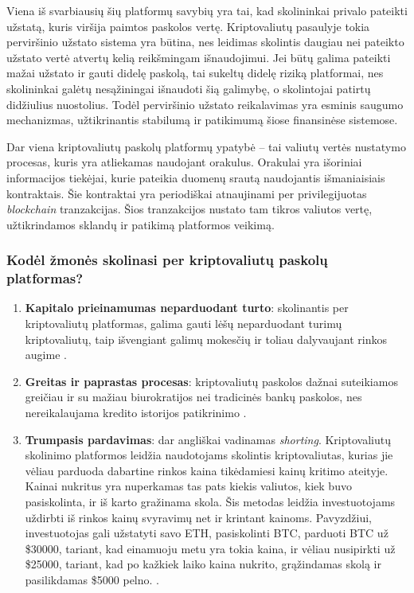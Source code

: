 \documentclass{VUMIFPSkursinis}
\begin{document}
Viena iš svarbiausių šių platformų savybių yra tai, kad skolininkai privalo pateikti užstatą, kuris viršija paimtos paskolos vertę. Kriptovaliutų pasaulyje tokia perviršinio užstato sistema yra būtina, nes leidimas skolintis daugiau nei pateikto užstato vertė atvertų kelią reikšmingam išnaudojimui. Jei būtų galima pateikti mažai užstato ir gauti didelę paskolą, tai sukeltų didelę riziką platformai, nes skolininkai galėtų nesąžiningai išnaudoti šią galimybę, o skolintojai patirtų didžiulius nuostolius. Todėl perviršinio užstato reikalavimas yra esminis saugumo mechanizmas, užtikrinantis stabilumą ir patikimumą šiose finansinėse sistemose.

Dar viena kriptovaliutų paskolų platformų ypatybė -- tai valiutų vertės nustatymo procesas, kuris yra atliekamas naudojant orakulus. Orakulai yra išoriniai informacijos tiekėjai, kurie pateikia duomenų srautą naudojantis išmaniaisiais kontraktais. Šie kontraktai yra periodiškai atnaujinami per privilegijuotas \textit{blockchain} tranzakcijas. Šios tranzakcijos nustato tam tikros valiutos vertę, užtikrindamos sklandų ir patikimą platformos veikimą.

\subsubsection{Kodėl žmonės skolinasi per kriptovaliutų paskolų platformas?}

\begin{enumerate}
    \item \textbf{Kapitalo prieinamumas neparduodant turto}: skolinantis per kriptovaliutų platformas, galima gauti lėšų neparduodant turimų kriptovaliutų, taip išvengiant galimų mokesčių ir toliau dalyvaujant rinkos augime \cite{kriptovaliutosio}.
    \item \textbf{Greitas ir paprastas procesas}: kriptovaliutų paskolos dažnai suteikiamos greičiau ir su mažiau biurokratijos nei tradicinės bankų paskolos, nes nereikalaujama kredito istorijos patikrinimo \cite{targettrend}.
    \item \textbf{Trumpasis pardavimas}: dar angliškai vadinamas \textit{shorting}. Kriptovaliutų skolinimo platformos leidžia naudotojams skolintis kriptovaliutas, kurias jie vėliau parduoda dabartine rinkos kaina tikėdamiesi kainų kritimo ateityje. Kainai nukritus yra nuperkamas tas pats kiekis valiutos, kiek buvo pasiskolinta, ir iš karto gražinama skola. Šis metodas leidžia investuotojams uždirbti iš rinkos kainų svyravimų net ir krintant kainoms. Pavyzdžiui, investuotojas gali užstatyti savo ETH, pasiskolinti BTC, parduoti BTC už \$30000, tariant, kad einamuoju metu yra tokia kaina, ir vėliau nusipirkti už \$25000, tariant, kad po kažkiek laiko kaina nukrito, grąžindamas skolą ir pasilikdamas \$5000 pelno.
    \cite{shortinimas}.
\end{enumerate}
\end{document}
